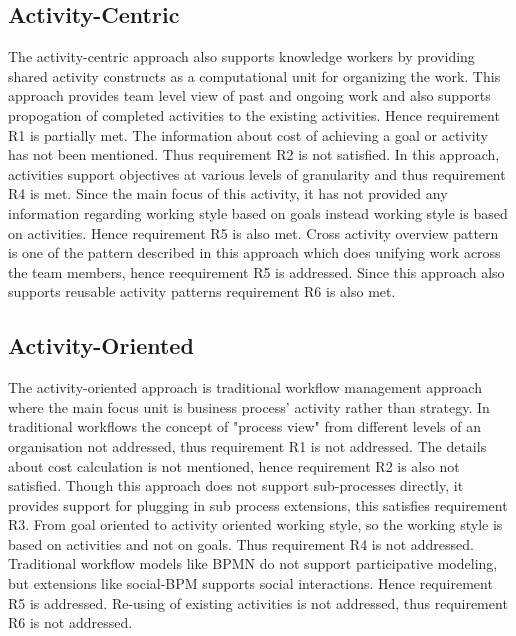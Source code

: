 \subsection{Activity-Centric} 
The activity-centric approach \cite{Yarosh2009} also supports knowledge workers by providing shared activity constructs as a computational unit for organizing the work. This approach provides team level view of past and ongoing work
and also supports propogation of completed activities to the existing activities. Hence requirement R1 is partially met. The information about cost of achieving a goal or activity has not been mentioned. Thus requirement R2 is not satisfied. In this approach, activities support objectives at various levels of granularity and thus requirement R4 is met. Since the main focus of this activity, it has
not provided any information regarding working style based on goals instead working style is based on activities. Hence requirement R5 is also met. Cross activity overview pattern is one of the pattern described in this approach which does unifying work across the team members, hence reequirement R5 is addressed. Since this approach also supports reusable activity patterns requirement R6 is also met. 
 
\subsection{Activity-Oriented} 
The activity-oriented approach \cite{Reijers2006} is traditional workflow management approach where the main focus unit is business process' activity rather than strategy. In traditional workflows the concept of "process view" from different levels of an organisation not addressed, thus requirement R1 is not addressed. The details about cost calculation is not mentioned, hence requirement R2 is also not satisfied. Though this approach does not support sub-processes directly, it provides support for plugging in sub process extensions, this satisfies requirement R3. From goal oriented to activity oriented working style, so the working style is based on activities and not on goals. Thus requirement R4 is not addressed. Traditional workflow models like BPMN do not support participative modeling, but extensions like social-BPM supports social interactions. Hence requirement R5 is addressed. Re-using of existing activities is not addressed, thus requirement R6 is not addressed.  

